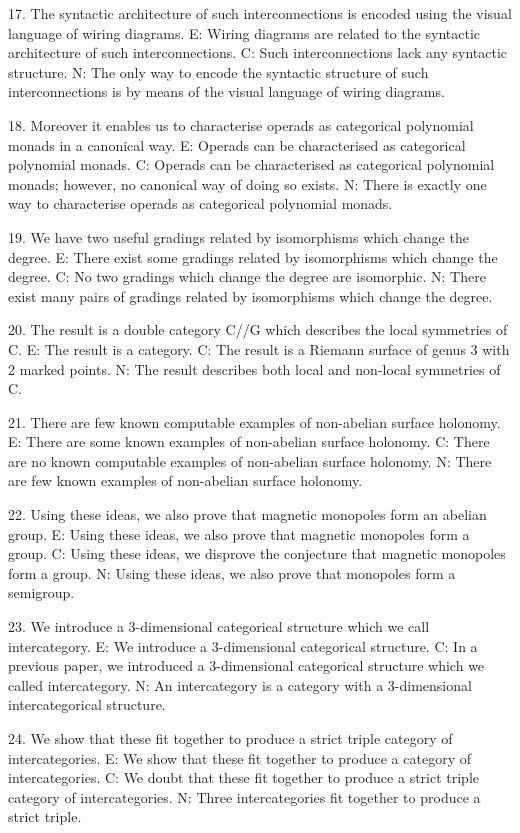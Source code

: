 17. The syntactic architecture of such interconnections is encoded using the visual language of wiring diagrams.
E: Wiring diagrams are related to the syntactic architecture of such interconnections.
C: Such interconnections lack any syntactic structure.
N: The only way to encode the syntactic structure of such interconnections is by means of the visual language of wiring diagrams.

18.  Moreover it enables us to characterise operads as categorical polynomial monads in a canonical way.
E: Operads can be characterised as categorical polynomial monads.
C: Operads can be characterised as categorical polynomial monads; however, no canonical way of doing so exists.
N: There is exactly one way to characterise operads as categorical polynomial monads.

19. We have two useful gradings related by isomorphisms which change the degree.
E: There exist some gradings related by isomorphisms which change the degree.
C: No two gradings which change the degree are isomorphic.
N: There exist many pairs of gradings related by isomorphisms which change the degree.

20.  The result is a double category C//G which describes the local symmetries of C.
E: The result is a category.
C: The result is a Riemann surface of genus 3 with 2 marked points.
N: The result describes both local and non-local symmetries of C.

21. There are few known computable examples of non-abelian surface holonomy.
E: There are some known examples of non-abelian surface holonomy.
C: There are no known computable examples of non-abelian surface holonomy.
N: There are few known examples of non-abelian surface holonomy.

22. Using these ideas, we also prove that magnetic monopoles form an abelian group.
E:  Using these ideas, we also prove that magnetic monopoles form a group.
C:  Using these ideas, we disprove the conjecture that magnetic monopoles form a group.
N: Using these ideas, we also prove that monopoles form a semigroup.

23.  We introduce a 3-dimensional categorical structure which we call intercategory.
E: We introduce a 3-dimensional categorical structure.
C: In a previous paper, we introduced a 3-dimensional categorical structure which we called intercategory.
N: An intercategory is a category with a 3-dimensional intercategorical structure.

24. We show that these fit together to produce a strict triple category of intercategories.
E: We show that these fit together to produce a category of intercategories.
C: We doubt that these fit together to produce a strict triple category of intercategories.
N: Three intercategories fit together to produce a strict triple.

